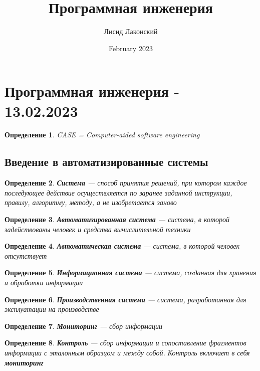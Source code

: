 \documentclass{article}
\title{Программная инженерия}
\author{Лисид Лаконский}
\date{February 2023}
\newtheorem{definition}{Определение}
\begin{document}
\raggedright

\maketitle
\tableofcontents
\pagebreak

\section{Программная инженерия - 13.02.2023}

\begin{definition}
    CASE = Computer-aided software engineering
\end{definition}

\subsection{Введение в автоматизированные системы}

\begin{definition}
    \textbf{Система} — способ принятия решений, при котором каждое последующее действие осуществляется по заранее заданной инструкции, правилу, алгоритму, методу, а не изобретается заново
\end{definition}

\begin{definition}
    \textbf{Автоматизированная система} — система, в которой задействованы человек и средства вычислительной техники
\end{definition}

\begin{definition}
    \textbf{Автоматическая система} — система, в которой человек отсутствует
\end{definition}

\begin{definition}
    \textbf{Информационная система} — система, созданная для хранения и обработки информации
\end{definition}

\begin{definition}
    \textbf{Производственная система} — система, разработанная для эксплуатации на производстве
\end{definition}

\begin{definition}
    \textbf{Мониторинг} — сбор информации
\end{definition}

\begin{definition}
    \textbf{Контроль} — сбор информации и сопоставление фрагментов информации с эталонным образцом и между собой. Контроль включает в себя \textbf{мониторинг}
\end{definition}
\end{document}
